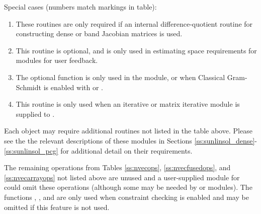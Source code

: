 Special cases (numbers match markings in table):
\begin{enumerate}
\item These routines are only required if an internal
  difference-quotient routine for constructing dense or band
  Jacobian matrices is used.
\item This routine is optional, and is only used in estimating
  space requirements for {\cvodes} modules for user feedback.
\item The optional function  is only used in the
  {\sunnonlinsolfixedpoint} module, or when Classical Gram-Schmidt is
  enabled with {\spgmr} or {\spfgmr}.
\item This routine is only used when an iterative or matrix iterative
  {\sunlinsol} module is supplied to {\cvodes}.
\end{enumerate}

Each {\sunlinsol} object may require additional {\nvector} routines
not listed in the table above.  Please see the the relevant
descriptions of these modules in Sections
\ref{ss:sunlinsol_dense}-\ref{ss:sunlinsol_pcg} for additional detail
on their {\nvector} requirements.

The remaining operations from Tables \ref{ss:nvecops}, \ref{ss:nvecfusedops}, and
\ref{ss:nvecarrayops} not listed above
are unused and a user-supplied {\nvector} module for {\cvodes} could
omit these operations (although some may be needed by {\sunnonlinsol}
or {\sunlinsol} modules).  The functions , 
, and  are only used when
constraint checking is enabled and may be omitted if this feature is
not used.
















